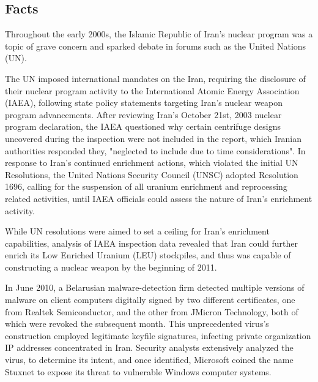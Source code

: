\documentclass[12pt]{article}
\begin{document}
\begin{multicols}{2}

\section{Facts}

Throughout the early 2000s, the Islamic Republic of Iran's nuclear program was a topic of grave concern and sparked debate in forums such as the United Nations (UN).\cite{unitedNationsResolutions}

The UN imposed international mandates on the Iran, requiring the disclosure of their nuclear program activity to the International Atomic Energy Association (IAEA), following state policy statements targeting Iran's nuclear weapon program advancements. After reviewing Iran's October 21st, 2003 nuclear program declaration, the IAEA questioned why certain centrifuge designs uncovered during the inspection were not included in the report, which Iranian authorities responded they, "neglected to include due to time considerations".\cite{implementationOfNPTSafeguards} In response to Iran's  continued enrichment actions, which violated the initial UN Resolutions, the United Nations Security Council (UNSC) adopted Resolution 1696, calling for the suspension of all uranium enrichment and reprocessing related activities, until IAEA officials could assess the nature of Iran's enrichment activity.\cite{resolution1696}

While UN resolutions were aimed to set a ceiling for Iran's enrichment capabilities, analysis of IAEA inspection data revealed that Iran could further enrich its Low Enriched Uranium (LEU) stockpiles, and thus was capable of constructing a nuclear weapon by the beginning of 2011.\cite{hasIranAchievedaNuclearWeapon}

In June 2010, a Belarusian malware-detection firm detected multiple versions of malware on client computers digitally signed by two different certificates, one from Realtek Semiconductor, and the other from JMicron Technology, both of which were revoked the subsequent month.\cite{theRealStoryOfStuxnet} This unprecedented virus's construction employed legitimate keyfile signatures, infecting private organization IP addresses concentrated in Iran.\cite{w32.stuxnetDossier} Security analysts extensively analyzed the virus, to determine its intent, and once identified, Microsoft coined the name Stuxnet to expose its threat to vulnerable Windows computer systems.\cite{microsoftCoinsStuxnet}


\end{multicols}
\end{document}
